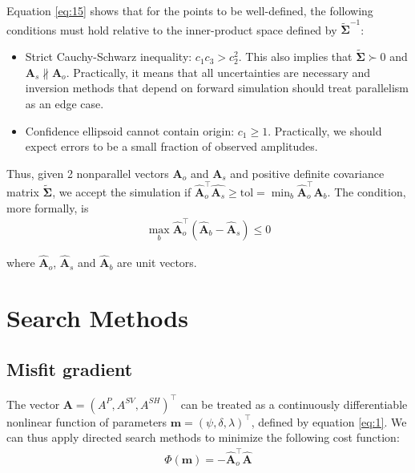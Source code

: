 \documentclass[preprint]{seismica}
\begin{document}
    Equation \ref{eq:15} shows that for the points to be well-defined, the following conditions
    must hold relative to the inner-product space defined by $\tilde{\bm{\Sigma}}^{-1}$:
    
    \begin{itemize}
      \item Strict Cauchy-Schwarz inequality: $c_1c_3 > c_2^2$. This also implies that
        $\tilde{\bm{\Sigma}} \succ 0$ and $\bm{A}_s \nparallel \bm{A}_o$. Practically, it means that all
        uncertainties are necessary and inversion methods that depend on forward simulation should
        treat parallelism as an edge case.
      \item Confidence ellipsoid cannot contain origin: $c_1 \geq 1$. Practically, we should expect
      errors to be a small fraction of observed amplitudes.
    \end{itemize}

    Thus, given 2 nonparallel vectors $\bm{A}_o$ and $\bm{A}_s$ and positive definite covariance
    matrix $\tilde{\bm{\Sigma}}$, we accept the simulation if $\hat{\bm{A}}_o^\top \hat{\bm{A}_s} \geq \text{tol} 
    = \min_b \hat{\bm{A}}_o^\top \hat{\bm{A}_b}$. The condition, more formally, is
    \begin{align} \label{eq:16}
      \max_b \hat{\bm{A}}_o^\top (\hat{\bm{A}}_b - \hat{\bm{A}}_s) \leq 0
    \end{align}

    \noindent where $\hat{\bm{A}}_o$, $\hat{\bm{A}}_s$ and $\hat{\bm{A}}_b$ are unit vectors.


\section{Search Methods} \label{sec:algorithms}
  
  \subsection{Misfit gradient}
    The vector $\bm{A} = (A^P, A^{SV}, A^{SH})^\top$ can be treated as a continuously differentiable 
    nonlinear function of parameters $\bm{m} = (\psi, \delta, \lambda)^\top$, defined by equation 
    \ref{eq:1}. We can thus apply directed search methods to minimize the following cost function:
    \begin{align} \label{eq:17}
      \Phi(\bm{m}) = -\hat{\bm{A}}_o^\top \hat{\bm{A}}
    \end{align}
\end{document}
